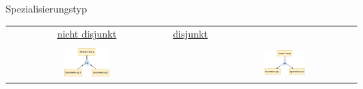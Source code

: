 \begin{defi}{Spezialisierungstyp}
    \begin{center}
        \begin{tabular}{ccc}
            \underline{nicht disjunkt} & \underline{disjunkt}                                              \\
            \\
            \includegraphics[width=0.3\textwidth]{includes/figures/definition_specialization_not_disjunct.pdf}
                                       & \quad                &
            \includegraphics[width=0.3\textwidth]{includes/figures/definition_specialization_disjunct.pdf} \\
        \end{tabular}
    \end{center}

\end{defi}


